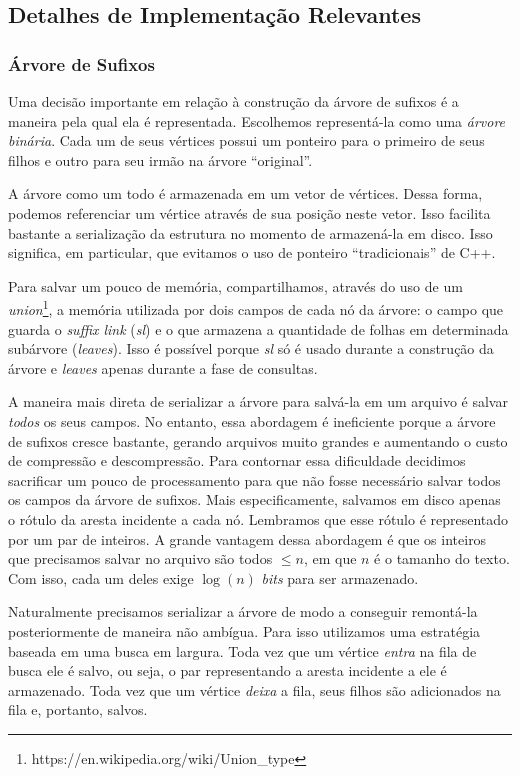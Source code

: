 \documentclass[]{article}
\begin{document}
\subsection{Detalhes de Implementação Relevantes}

\subsubsection{Árvore de Sufixos}

Uma decisão importante em relação à construção da árvore de sufixos é a maneira pela qual ela é representada. Escolhemos representá-la como uma \textit{árvore binária}. Cada um de seus vértices possui um ponteiro para o primeiro de seus filhos e outro para seu irmão na árvore ``original''. 

A árvore como um todo é armazenada em um vetor de vértices. Dessa forma, podemos referenciar um vértice através de sua posição neste vetor. Isso facilita bastante a serialização da estrutura no momento de armazená-la em disco. Isso significa, em particular, que evitamos o uso de ponteiro ``tradicionais'' de C++.

Para salvar um pouco de memória, compartilhamos, através do uso de um \textit{union}\footnote{https://en.wikipedia.org/wiki/Union\_type}, a memória utilizada por dois campos de cada nó da árvore: o campo que guarda o \textit{suffix link} (\textit{sl}) e o que armazena a quantidade de folhas em determinada subárvore (\textit{leaves}). Isso é possível porque \textit{sl} só é usado durante a construção da árvore e \textit{leaves} apenas durante a fase de consultas.

A maneira mais direta de serializar a árvore para salvá-la em um arquivo é salvar \textit{todos} os seus campos. No entanto, essa abordagem é ineficiente porque a árvore de sufixos cresce bastante, gerando arquivos muito grandes e aumentando o custo de compressão e descompressão. Para contornar essa dificuldade decidimos sacrificar um pouco de processamento para que não fosse necessário salvar todos os campos da árvore de sufixos. Mais especificamente, salvamos em disco apenas o rótulo da aresta incidente a cada nó. Lembramos que esse rótulo é representado por um par de inteiros. A grande vantagem dessa abordagem é que os inteiros que precisamos salvar no arquivo são todos $\leq n$, em que $n$ é o tamanho do texto. Com isso, cada um deles exige $\log(n)$ \textit{bits} para ser armazenado.

Naturalmente precisamos serializar a árvore de modo a conseguir remontá-la posteriormente de maneira não ambígua. Para isso utilizamos uma estratégia baseada em uma busca em largura. Toda vez que um vértice \textit{entra} na fila de busca ele é salvo, ou seja, o par representando a aresta incidente a ele é armazenado. Toda vez que um vértice \textit{deixa} a fila, seus filhos são adicionados na fila e, portanto, salvos. 
\end{document}
